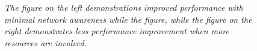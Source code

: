 \documentclass{rspublic}
\begin{document}
\begin{center}
\begin{figure}
  \label{Fig:IntelligentExp:a}
  \label{Fig:IntelligentExp:b}
\caption{\textit{The figure on the left demonstrations improved
performance with minimal network awareness while the figure, while the
figure on the right demonstrates less performance improvement when more
resources are involved.}}
\label{Fig:IntelligentExp}
\end{figure}
\end{center}
\end{document}
